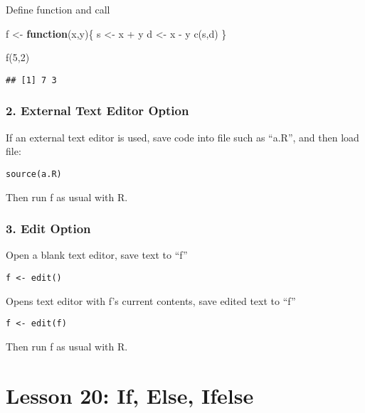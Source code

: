 \documentclass[
]{article}
\newenvironment{Shaded}{\begin{snugshade}}{\end{snugshade}}
\newcommand{\ControlFlowTok}[1]{\textcolor[rgb]{0.13,0.29,0.53}{\textbf{#1}}}
\newcommand{\DecValTok}[1]{\textcolor[rgb]{0.00,0.00,0.81}{#1}}
\newcommand{\FunctionTok}[1]{\textcolor[rgb]{0.00,0.00,0.00}{#1}}
\newcommand{\NormalTok}[1]{#1}
\newcommand{\OtherTok}[1]{\textcolor[rgb]{0.56,0.35,0.01}{#1}}
\newcommand{\SpecialCharTok}[1]{\textcolor[rgb]{0.00,0.00,0.00}{#1}}
\begin{document}
Define function and call

\begin{Shaded}
\begin{Highlighting}[]
\NormalTok{f }\OtherTok{\textless{}{-}} \ControlFlowTok{function}\NormalTok{(x,y)\{}
\NormalTok{   s }\OtherTok{\textless{}{-}}\NormalTok{ x }\SpecialCharTok{+}\NormalTok{ y}
\NormalTok{   d }\OtherTok{\textless{}{-}}\NormalTok{ x }\SpecialCharTok{{-}}\NormalTok{ y}
   \FunctionTok{c}\NormalTok{(s,d)}
\NormalTok{\}}
\end{Highlighting}
\end{Shaded}

\begin{Shaded}
\begin{Highlighting}[]
\FunctionTok{f}\NormalTok{(}\DecValTok{5}\NormalTok{,}\DecValTok{2}\NormalTok{)}
\end{Highlighting}
\end{Shaded}

\begin{verbatim}
## [1] 7 3
\end{verbatim}

\hypertarget{external-text-editor-option}{%
\subsubsection{2. External Text Editor
Option}\label{external-text-editor-option}}

If an external text editor is used, save code into file such as ``a.R'',
and then load file:

\texttt{source(\textquotesingle{}a.R\textquotesingle{})}

Then run f as usual with R.

\hypertarget{edit-option}{%
\subsubsection{\texorpdfstring{\textbf{3. Edit
Option}}{3. Edit Option}}\label{edit-option}}

Open a blank text editor, save text to ``f''

\texttt{f\ \textless{}-\ edit()}

Opens text editor with f's current contents, save edited text to ``f''

\texttt{f\ \textless{}-\ edit(f)}

Then run f as usual with R.

\hypertarget{lesson-20-if-else-ifelse}{%
\section{Lesson 20: If, Else, Ifelse}\label{lesson-20-if-else-ifelse}}
\end{document}

